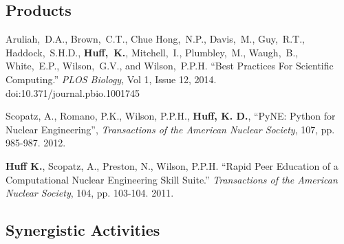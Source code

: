 \documentclass[svgnames,11pt]{article}
\begin{document}
\subsection{Products}

\begin{bibenum}[itemsep=5pt]
   \item Aruliah,~D.A., Brown,~C.T., Chue Hong,~N.P., Davis,~M., Guy,~R.T., 
          Haddock,~S.H.D., \textbf{Huff,~K.}, Mitchell,~I., Plumbley,~M., Waugh,~B., 
          White,~E.P., Wilson,~G.V., and Wilson,~P.P.H.  ``Best Practices For 
          Scientific Computing.'' \textsl{PLOS Biology}, Vol 1, Issue 12, 2014. 
          doi:10.371/journal.pbio.1001745

   \item  Scopatz, A., Romano, P.K., Wilson, P.P.H., \textbf{Huff, K. D.}, 
          ``PyNE: Python for Nuclear Engineering'', \emph{Transactions of the 
          American Nuclear Society}, 107, pp. 985-987.  2012.

   \item \textbf{Huff K.}, Scopatz, A., Preston, N., Wilson, P.P.H. ``Rapid
          Peer Education of a Computational Nuclear Engineering Skill Suite.''
          \emph{Transactions of the American Nuclear Society}, 104, pp. 103-104. 
          2011.
\end{bibenum}

\subsection{Synergistic Activities}
\end{document}
